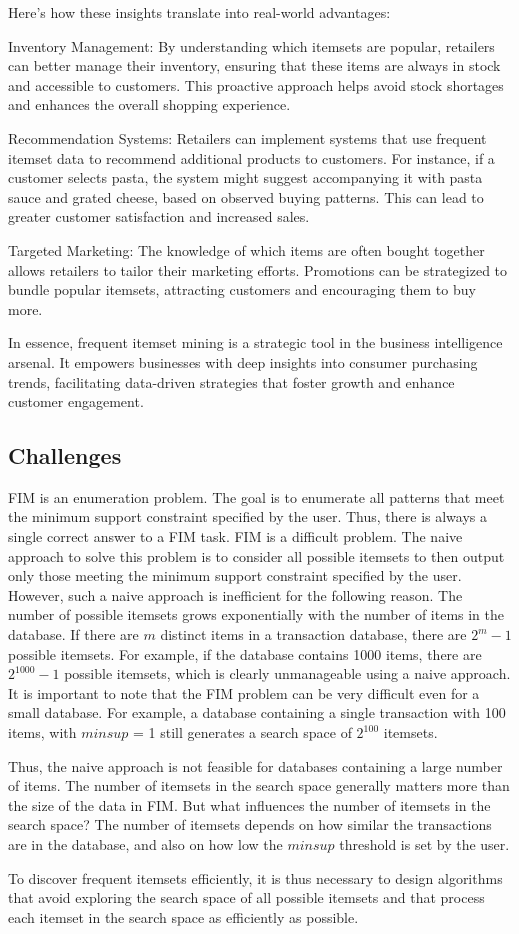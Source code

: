 Here's how these insights translate into real-world advantages:

Inventory Management: By understanding which itemsets are popular, retailers can better manage their inventory, ensuring that these items are always in stock and accessible to customers. This proactive approach helps avoid stock shortages and enhances the overall shopping experience.

Recommendation Systems: Retailers can implement systems that use frequent itemset data to recommend additional products to customers. For instance, if a customer selects pasta, the system might suggest accompanying it with pasta sauce and grated cheese, based on observed buying patterns. This can lead to greater customer satisfaction and increased sales.

Targeted Marketing: The knowledge of which items are often bought together allows retailers to tailor their marketing efforts. Promotions can be strategized to bundle popular itemsets, attracting customers and encouraging them to buy more.

In essence, frequent itemset mining is a strategic tool in the business intelligence arsenal. It empowers businesses with deep insights into consumer purchasing trends, facilitating data-driven strategies that foster growth and enhance customer engagement.


\subsection{Challenges}
FIM is an enumeration problem. The goal is to enumerate all patterns that meet the
minimum support constraint specified by the user. Thus, there is always a single correct
answer to a FIM task. FIM is a difficult problem. The naive approach to solve this problem
is to consider all possible itemsets to then output only those meeting the minimum support
constraint specified by the user. However, such a naive approach is inefficient for the following
reason. The number of possible itemsets grows exponentially with the number of items in the
database.
If there are $m$ distinct items in a transaction database, there are $2^m - 1$ possible itemsets.
For example, if the database contains 1000 items, there are $2^{1000} - 1$ possible itemsets,
which is clearly unmanageable using a naive approach. It is important
to note that the FIM problem can be very difficult even for a small database. For example,
a database containing a single transaction with 100 items, with $minsup$ = 1 still generates
a search space of $2^{100}$ itemsets.

Thus, the naive approach is not feasible for databases containing a large number of items.
The number of itemsets in the search space generally matters more than the size of the data in FIM. But what influences the number of itemsets
in the search space? The number of itemsets depends on how similar the transactions are in
the database, and also on how low the $minsup$ threshold is set by the user.

To discover frequent itemsets efficiently, it is thus necessary to design algorithms that
avoid exploring the search space of all possible itemsets and that process each itemset in the
search space as efficiently as possible.
